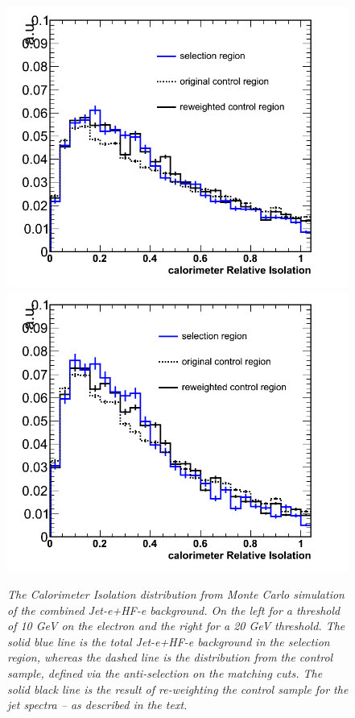 \begin{figure}[ht!]
\centering
\includegraphics[scale=0.32]{Plots/caloIso_pt10_fakes.png}
\includegraphics[scale=0.32]{Plots/caloIso_pt20_fakes.png}
\caption{\textit{The Calorimeter Isolation distribution from Monte Carlo simulation of the combined Jet-e+HF-e background.   On the left for a threshold of 10 GeV on the electron and the right for a 20 GeV threshold.  The solid blue line is the total Jet-e+HF-e background in the selection region, whereas the dashed line is the distribution from the control sample, defined via the anti-selection on the matching cuts.  The solid black line is the result of re-weighting the control sample for the jet spectra -- as described in the text.}}\label{fig:caloIso_fakes}
\end{figure}

